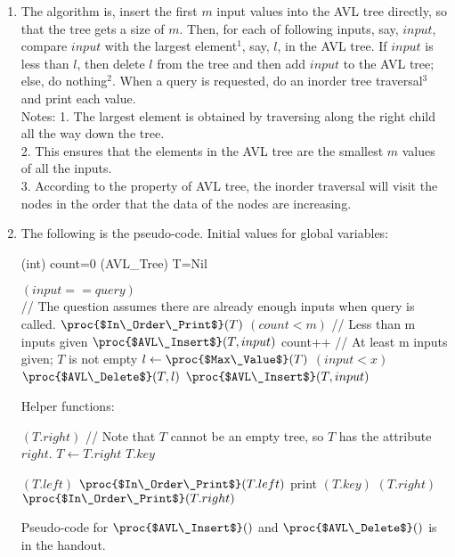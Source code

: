 \documentclass[11pt, answers]{exam}
\theoremstyle{plain}
\theoremstyle{definition}
\begin{document}
\begin{questions}
\begin{solution}
\begin{enumerate}
\item The algorithm is, insert the first $m$ input values into the AVL tree directly, so that the tree gets a size of $m$. Then, for each of following inputs, say, $input$, compare $input$ with the largest element$^1$, say, $l$, in the AVL tree. If $input$ is less than $l$, then delete $l$ from the tree and then add $input$ to the AVL tree; else, do nothing$^2$. When a query is requested, do an inorder tree traversal$^3$ and print each value.\\
Notes: 
1. The largest element is obtained by traversing along the right child all the way down the tree.\\
2. This ensures that the elements in the AVL tree are the smallest $m$ values of all the inputs. \\
3.  According to the property of AVL tree, the inorder traversal will visit the nodes in the order that the data of the nodes are increasing.\\

\item The following is the pseudo-code.
Initial values for global variables:
\begin{codebox}
\li (int) count=0
\li (AVL\_Tree) T=Nil
\end{codebox}

\begin{codebox}
\li \If $(input == query)$ \\// The question assumes there are already enough inputs when query is called.
\li     \Then $\proc{$In\_Order\_Print$}(T)$
\li     \Else
\li     \If $(count < m)$ // Less than m inputs given
\li         \Then $\proc{$AVL\_Insert$}(T, input)$
\li         count++
\li     \Else // At least m inputs given; $T$ is not empty
\li         $l \gets \proc{$Max\_Value$}(T)$
\li         \If $(input<x)$
\li             \Then $\proc{$AVL\_Delete$}(T, l)$
\li             $\proc{$AVL\_Insert$}(T, input)$
\end{codebox}
Helper functions:
\begin{codebox}
\li \While $(T.right)$ // Note that $T$ cannot be an empty tree, so $T$ has the attribute $right$.
\li     \Do $T \gets T.right$ \End
\li \Return $T.key$
\end{codebox}
\begin{codebox}
\li \If $(T.left)$
\li     \Then $\proc{$In\_Order\_Print$}(T.left)$ \End
\li print $(T.key)$
\li \If $(T.right)$
\li     \Then $\proc{$In\_Order\_Print$}(T.right)$ \End
\end{codebox}
Pseudo-code for $\proc{$AVL\_Insert$}()$ and $\proc{$AVL\_Delete$}()$ is in the handout.


\end{enumerate}
\end{solution}
\end{questions}
\end{document}
